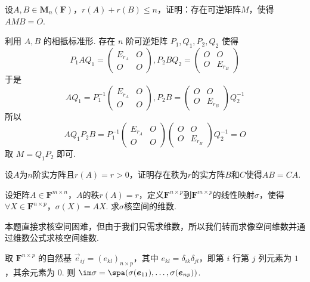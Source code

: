 \begin{exercise}
\begin{exgroup}
        \item 设$A,B \in \mathbf{M}_n(\mathbf{F})$，$r(A)+r(B) \leqslant n$，证明：存在可逆矩阵$M$，使得$AMB=O$.
        \begin{answer}
            利用 $A,B$ 的相抵标准形. 存在 $n$ 阶可逆矩阵 $P_1,Q_1,P_2,Q_2$ 使得
          \[P_1AQ_1=\begin{pmatrix}E_{r_A} & O \\ O & O\end{pmatrix},P_2BQ_2=\begin{pmatrix}O & O \\ O & E_{r_B}\end{pmatrix}\]
          于是 \[AQ_1=P_1^{-1}\begin{pmatrix}E_{r_A} & O \\ O & O\end{pmatrix},P_2B=\begin{pmatrix}O & O \\ O & E_{r_B}\end{pmatrix}Q_2^{-1}\]
          所以 \[AQ_1P_2B=P_1^{-1}\begin{pmatrix}E_{r_A} & O \\ O & O\end{pmatrix}\begin{pmatrix}O & O \\ O & E_{r_B}\end{pmatrix}Q_2^{-1}=O\]
          取 $M=Q_1P_2$ 即可.
        \end{answer}

        \item 设$A$为$n$阶实方阵且$r(A)=r>0$，证明存在秩为$r$的实方阵$B$和$C$使得$AB=CA$. %
    \end{exgroup}

    \begin{exgroup}
        \item 设矩阵$A \in \mathbf{F}^{m \times n}$，$A$的秩$r(A)=r$，定义$\mathbf{F}^{n \times p}$到$\mathbf{F}^{m \times p}$的线性映射$\sigma$，使得$\forall X \in \mathbf{F}^{n \times p}$，$\sigma(X)=AX$. 求$\sigma$核空间的维数.
        \begin{answer}
            本题直接求核空间困难，但由于我们只需求维数，所以我们转而求像空间维数并通过维数公式求核空间维数.

          取 $ \mathbf{F}^{n \times p} $ 的自然基 $ \vec{e}_{ij} = (e_{kl})_{n \times p} $，其中 $ e_{kl} = \delta_{ik} \delta_{jl} $，即第 $ i $ 行第 $ j $ 列元素为 $ 1 $，其余元素为 $ 0 $. 则 $ \im \sigma = \spa(\sigma(\vec{e}_{11}), \ldots, \sigma(\vec{e}_{np})) $.


\end{answer}
\end{exgroup}
\end{exercise}
